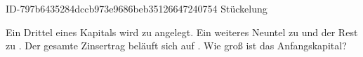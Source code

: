 \begin{exercise}
      {ID-797b6435284dccb973e9686beb35126647240754}
      {Stückelung}
  \ifproblem\problem\par
    Ein Drittel eines Kapitals wird zu  angelegt. Ein weiteres Neuntel
    zu  und der Rest zu . Der gesamte Zinsertrag beläuft
    sich auf . Wie groß ist das Anfangskapital?
  \fi
\end{exercise}
